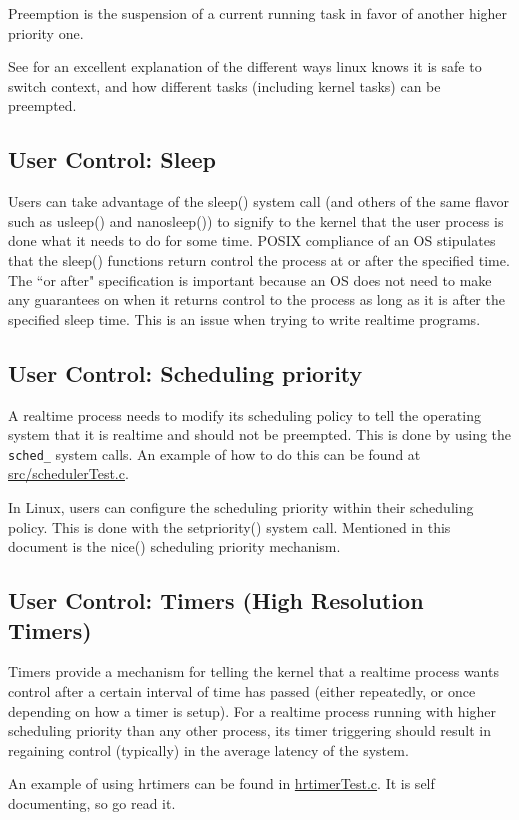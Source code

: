 \documentclass{article}
\begin{document}
Preemption is the suspension of a current running task in favor of another higher priority one.

See \cite{LinuxProcessSwitch} for an excellent explanation of the different ways linux knows it is safe to switch context, and how different tasks (including kernel tasks) can be preempted.

\subsection{User Control: Sleep}
Users can take advantage of the sleep() system call (and others of the same flavor such as usleep() and nanosleep()) to signify to the kernel that the user process is done what it needs to do for some time.  POSIX compliance of an OS stipulates that the sleep() functions return control the process at or after the specified time.  The ``or after" specification is important because an OS does not need to make any guarantees on when it returns control to the process as long as it is after the specified sleep time.  This is an issue when trying to write realtime programs.
\subsection{User Control: Scheduling priority}
A realtime process needs to modify its scheduling policy to tell the operating system that it is realtime and should not be preempted.  This is done by using the \texttt{sched\_\*} system calls.  An example of how to do this can be found at \href{https://github.com/ianohara/rt-linux-examples/blob/master/src/schedulerTest.c}{src/schedulerTest.c}.

In Linux, users can configure the scheduling priority within their scheduling policy.  This is done with the setpriority() system call.  Mentioned in this document is the nice() scheduling priority mechanism. 
\subsection{User Control: Timers (High Resolution Timers)}
Timers provide a mechanism for telling the kernel that a realtime process wants control after a certain interval of time has passed (either repeatedly, or once depending on how a timer is setup).  For a realtime process running with higher scheduling priority than any other process, its timer triggering should result in regaining control (typically) in the average latency of the system.

An example of using hrtimers can be found in \href{https://github.com/ianohara/rt-linux-examples/blob/master/src/hrtimerTest.c}{hrtimerTest.c}.  It is self documenting, so go read it.
\end{document}

